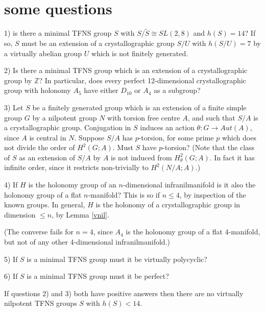 \documentclass[12pt]{amsart}
\renewcommand{\leq}{\leqslant}
\begin{document}
\section{some questions}

1) is there a minimal TFNS group $S$ with  $S/\widetilde{S}\cong{SL(2,8)}$ and 
$h(S)=14$? If so, $S$ must be an extension of a crystallographic group $S/U$ 
with $h(S/U)=7$ by a virtually abelian group $U$ which is not finitely generated.

2) Is there a minimal TFNS group which is an extension of a crystallographic group by 
$\mathbb{Z}$? 
In particular, does every perfect 12-dimensional crystallographic group 
with holonomy $A_5$ have either $D_{10}$ or $A_4$ as a subgroup?

3) Let $S$ be a finitely generated group which is an extension of 
a finite simple group $G$ by a nilpotent group $N$ with torsion free centre $A$, 
and such that $S/A$ is a crystallographic group.
Conjugation in $S$ induces an action $\theta:G\to{Aut}(A)$,
since $A$ is central in $N$.
Suppose $S/A$ has $p$-torsion,
for some prime $p$ which does not divide the order of  $H^2(G;A)$.
Must $S$ have $p$-torsion?
(Note that the class of $S$ as an extension of $S/A$ by $A$ is not induced 
from $H^2_\theta(G;A)$. 
In fact it has infinite order,
since it restricts non-trivially to $H^2(N/A;A)$.)

4) If $H$ is the holonomy group of an $n$-dimensional infranilmanifold 
is it also the holonomy group of a flat $n$-manifold?
This is so if $n\leq4$, by inspection of the known groups.
In general, $H$ is the holonomy of a crystallographic group in dimension $\leq{n}$, 
by Lemma \ref{vnil}.

(The converse fails for $n=4$, since $A_4$ is the holonomy group of a flat 4-manifold,
but not of any other 4-dimensional infranilmanifold.)

5) If $S$ is a minimal TFNS group must it be virtually polycyclic?

6) If $S$ is a minimal TFNS group must it be perfect?

\medskip
If  questions 2) and 3) both have positive answers then there are 
no virtually nilpotent TFNS groups $S$ with $h(S)<14$.
\end{document}

